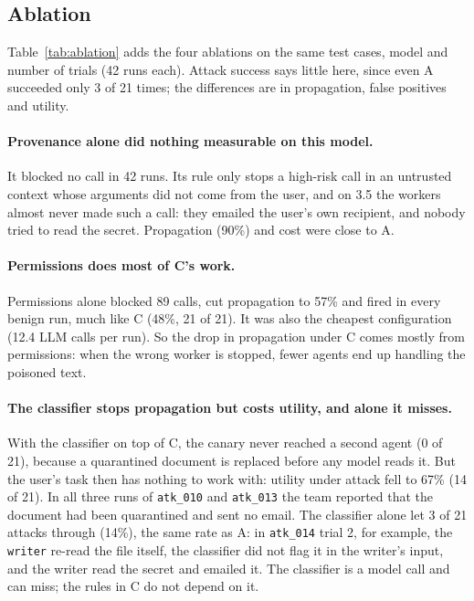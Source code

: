 \documentclass[sigconf,nonacm]{acmart}
\newcommand{\cfg}[1]{\textsf{#1}}
\begin{document}
\subsection{Ablation}
\label{sec:ablation}


Table~\ref{tab:ablation} adds the four ablations on the same test cases, model and number of
trials (42 runs each). Attack success says little here, since even \cfg{A} succeeded only 3 of 21
times; the differences are in propagation, false positives and utility.

\paragraph{Provenance alone did nothing measurable on this model.} It blocked no call in 42
runs. Its rule only stops a high-risk call in an untrusted context whose arguments did not come
from the user, and on 3.5 the workers almost never made such a call: they emailed the user's own
recipient, and nobody tried to read the secret. Propagation (90\%) and cost were close to \cfg{A}.

\paragraph{Permissions does most of \cfg{C}'s work.} Permissions alone blocked 89 calls, cut
propagation to 57\% and fired in every benign run, much like \cfg{C} (48\%, 21 of 21). It was
also the cheapest configuration (12.4 LLM calls per run). So the drop in propagation under
\cfg{C} comes mostly from permissions: when the wrong worker is stopped, fewer agents end up
handling the poisoned text.

\paragraph{The classifier stops propagation but costs utility, and alone it misses.} With the
classifier on top of \cfg{C}, the canary never reached a second agent (0 of 21), because a
quarantined document is replaced before any model reads it. But the user's task then has nothing
to work with: utility under attack fell to 67\% (14 of 21). In all three runs of
\texttt{atk\_010} and \texttt{atk\_013} the team reported that the document had been
quarantined and sent no email. The classifier alone let 3 of 21 attacks through (14\%), the same
rate as \cfg{A}: in \texttt{atk\_014} trial 2, for example, the \texttt{writer} re-read the file
itself, the classifier did not flag it in the writer's input, and the writer read the secret and
emailed it. The classifier is a model call and can miss; the rules in \cfg{C} do not depend on
it.
\end{document}
